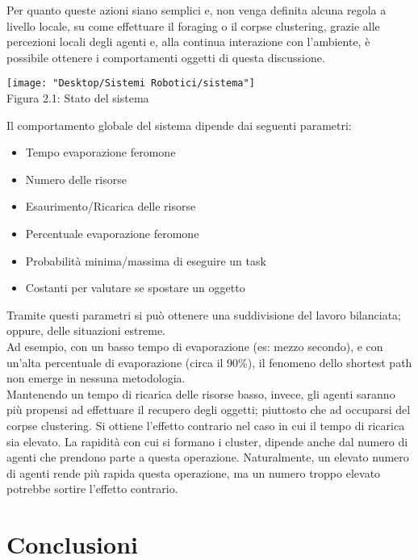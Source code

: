 \documentclass[12pt,a4paper,openright,twoside]{report}
\begin{document}
Per quanto queste azioni siano semplici e, non venga definita alcuna regola a livello locale, su come effettuare il foraging o il corpse clustering, grazie alle percezioni locali degli agenti e, alla continua interazione con l'ambiente, è possibile ottenere i comportamenti oggetti di questa discussione.\\

\begin{center}  
	\texttt{[image: "Desktop/Sistemi Robotici/sistema"]}
	\\Figura 2.1: Stato del sistema
\end{center}

Il comportamento globale del sistema dipende dai seguenti parametri:\\
\begin{itemize}
	\item Tempo evaporazione feromone
	\item Numero delle risorse
	\item Esaurimento/Ricarica delle risorse
	\item Percentuale evaporazione feromone
	\item Probabilità minima/massima di eseguire un task
	\item Costanti per valutare se spostare un oggetto
\end{itemize}

Tramite questi parametri si può ottenere una suddivisione del lavoro bilanciata; oppure, delle situazioni estreme.\\
Ad esempio, con un basso tempo di evaporazione (es: mezzo secondo), e con un'alta percentuale di evaporazione (circa il 90\%), il fenomeno dello shortest path non emerge in nessuna metodologia.\\
Mantenendo un tempo di ricarica delle risorse basso, invece, gli agenti saranno più propensi ad effettuare il recupero degli oggetti; piuttosto che ad occuparsi del corpse clustering. Si ottiene l'effetto contrario nel caso in cui il tempo di ricarica sia elevato.
La rapidità con cui si formano i cluster, dipende anche dal numero di agenti che prendono parte a questa operazione. Naturalmente, un elevato numero di agenti rende più rapida questa operazione, ma un numero troppo elevato potrebbe sortire l'effetto contrario.\\

\clearpage{\pagestyle{empty}\cleardoublepage}
\chapter{Conclusioni}                %
\lhead[\fancyplain{}{\bfseries\thepage}]{\fancyplain{}{\bfseries\rightmark}}
\end{document}
